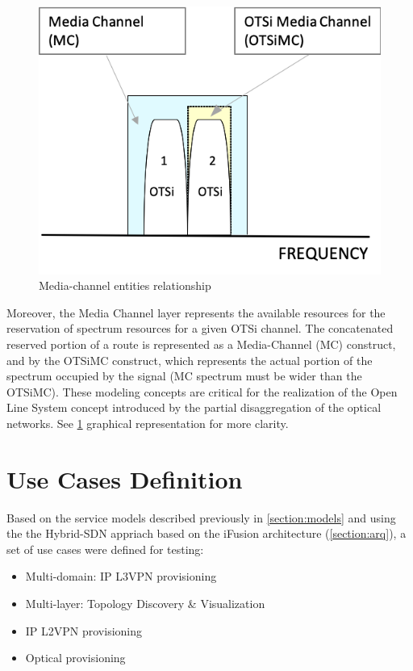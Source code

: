 \documentclass[a4paper,fleqn]{cas-dc}
\begin{document}
\begin{figure}
	\centering
		\includegraphics[scale=0.75]{figs/Media_channel.png}
	\caption{Media-channel entities relationship}
	\label{FIG:Media_channel}
\end{figure}

Moreover, the Media Channel layer represents the available resources for the reservation of spectrum resources for a given OTSi channel. The concatenated reserved portion of a route is represented as a Media-Channel (MC) construct, and by the OTSiMC construct, which represents the actual portion of the spectrum occupied by the signal (MC spectrum must be wider than the OTSiMC). These modeling concepts are critical for the realization of the Open Line System concept introduced by the partial disaggregation of the optical networks. See \cref{FIG:Media_channel} graphical representation for more clarity.


\section{Use Cases Definition}
\label{sec:usecasesdef}
Based on the service models described previously in \cref{section:models} and using the the Hybrid-SDN appriach based on the iFusion architecture (\cref{section:arq}), a set of use cases were defined for testing: 
\begin{itemize}
    \item Multi-domain: IP L3VPN provisioning
    \item Multi-layer: Topology Discovery \& Visualization
    \item IP L2VPN provisioning
    \item Optical provisioning
\end{itemize}
\end{document}
